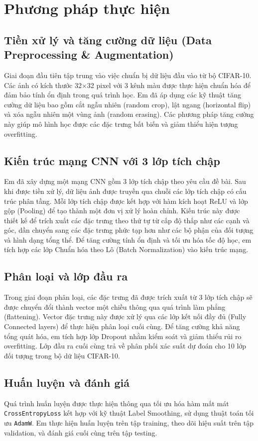 \documentclass[12pt, a4paper, openany]{report}
\begin{document}
\chapter{Phương pháp thực hiện}
\section{Tiền xử lý và tăng cường dữ liệu (Data Preprocessing \& Augmentation)}
Giai đoạn đầu tiên tập trung vào việc chuẩn bị dữ liệu đầu vào từ bộ CIFAR-10. Các ảnh có kích thước 32×32 pixel với 3 kênh màu được thực hiện chuẩn hóa để đảm bảo tính ổn định trong quá trình học. Em đã áp dụng các kỹ thuật tăng cường dữ liệu bao gồm cắt ngẫu nhiên (random crop), lật ngang (horizontal flip) và xóa ngẫu nhiên một vùng ảnh (random erasing). Các phương pháp tăng cường này giúp mô hình học được các đặc trưng bất biến và giảm thiểu hiện tượng overfitting.

\section{Kiến trúc mạng CNN với 3 lớp tích chập}
Em đã xây dựng một mạng CNN gồm 3 lớp tích chập theo yêu cầu đề bài. Sau khi được tiền xử lý, dữ liệu ảnh được truyền qua chuỗi các lớp tích chập có cấu trúc phân tầng. Mỗi lớp tích chập được kết hợp với hàm kích hoạt ReLU và lớp gộp (Pooling) để tạo thành một đơn vị xử lý hoàn chỉnh. Kiến trúc này được thiết kế để trích xuất các đặc trưng theo thứ tự từ cấp độ thấp như các cạnh và góc, dần chuyển sang các đặc trưng phức tạp hơn như các bộ phận của đối tượng và hình dạng tổng thể. Để tăng cường tính ổn định và tối ưu hóa tốc độ học, em tích hợp các lớp Chuẩn hóa theo Lô (Batch Normalization) vào kiến trúc mạng.

\section{Phân loại và lớp đầu ra}
Trong giai đoạn phân loại, các đặc trưng đã được trích xuất từ 3 lớp tích chập sẽ được chuyển đổi thành vector một chiều thông qua quá trình làm phẳng (flattening). Vector đặc trưng này được xử lý qua các lớp kết nối đầy đủ (Fully Connected layers) để thực hiện phân loại cuối cùng. Để tăng cường khả năng tổng quát hóa, em tích hợp lớp Dropout nhằm kiểm soát và giảm thiểu rủi ro overfitting. Lớp đầu ra cuối cùng trả về phân phối xác suất dự đoán cho 10 lớp đối tượng trong bộ dữ liệu CIFAR-10.

\section{Huấn luyện và đánh giá}
Quá trình huấn luyện được thực hiện thông qua tối ưu hóa hàm mất mát \texttt{CrossEntropyLoss} kết hợp với kỹ thuật Label Smoothing, sử dụng thuật toán tối ưu \texttt{AdamW}. Em thực hiện huấn luyện trên tập training, theo dõi hiệu suất trên tập validation, và đánh giá cuối cùng trên tập testing.
\end{document}
